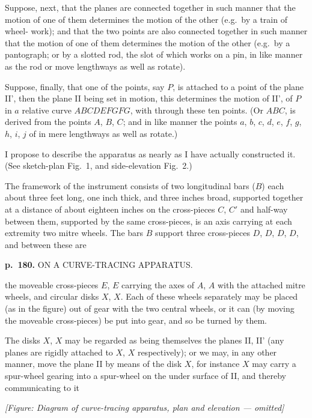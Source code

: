 \documentclass[11pt,a4paper]{article}
\begin{document}
Suppose, next, that the planes are connected together in such manner that the
motion of one of them determines the motion of the other (e.g.\ by a train of wheel-
work); and that the two points are also connected together in such manner that the
motion of one of them determines the motion of the other (e.g.\ by a pantograph; or
by a slotted rod, the slot of which works on a pin, in like manner as the rod or
move lengthways as well as rotate).

Suppose, finally, that one of the points, say $P$, is attached to a point of the
plane II', then the plane II being set in motion, this determines the motion of II',
of $P$ in $a$ relative curve $ABCDEFGFG$, with through these ten points.  (Or $ABC$, is
derived from the points $A$, $B$, $C$; and in like manner the points $a$, $b$, $c$, $d$, $e$, $f$, $g$, $h$, $i$, $j$ of in mere lengthways as well as rotate.)

I propose to describe the apparatus as nearly as I have actually constructed it.
(See sketch-plan Fig.\ 1, and side-elevation Fig.\ 2.)

The framework of the instrument consists of two longitudinal bars ($B$) each about
three feet long, one inch thick, and three inches broad, supported together at a
distance of about eighteen inches on the cross-pieces $C$, $C'$ and half-way between
them, supported by the same cross-pieces, is an axis carrying at each extremity two
mitre wheels.  The bars $B$ support three cross-pieces $D$, $D$, $D$, $D$, and between these are

\clearpage

\noindent
\textbf{p.~180.}  ON A CURVE-TRACING APPARATUS.

the moveable cross-pieces $E$, $E$ carrying the axes of $A$, $A$ with the attached mitre
wheels, and circular disks $X$, $X$. Each of these wheels separately may be placed (as
in the figure) out of gear with the two central wheels, or it can (by moving the
moveable cross-pieces) be put into gear, and so be turned by them.

The disks $X$, $X$ may be regarded as being themselves the planes II, II' (any
planes are rigidly attached to $X$, $X$ respectively); or we may, in any other manner,
move the plane II by means of the disk $X$, for instance $X$ may carry a spur-wheel
gearing into a spur-wheel on the under surface of II, and thereby communicating to it

\begin{center}
\textit{[Figure: Diagram of curve-tracing apparatus, plan and elevation --- omitted]}
\end{center}
\end{document}
